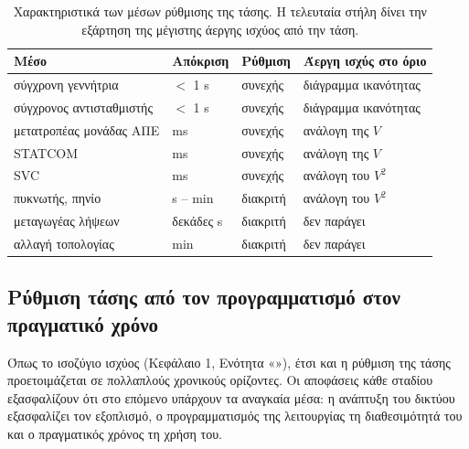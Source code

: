 \begin{table}[!htbp]
\centering
\begin{tabular}{llll}
\hline
Μέσο & Απόκριση & Ρύθμιση & Άεργη ισχύς στο όριο \\
\hline
σύγχρονη γεννήτρια & $<$ 1 s & συνεχής & διάγραμμα ικανότητας \\
σύγχρονος αντισταθμιστής & $<$ 1 s & συνεχής & διάγραμμα ικανότητας \\
μετατροπέας μονάδας ΑΠΕ & ms & συνεχής & ανάλογη της $V$ \\
STATCOM & ms & συνεχής & ανάλογη της $V$ \\
SVC & ms & συνεχής & ανάλογη του $V^2$ \\
πυκνωτής, πηνίο & s -- min & διακριτή & ανάλογη του $V^2$ \\
μεταγωγέας λήψεων & δεκάδες s & διακριτή & δεν παράγει \\
αλλαγή τοπολογίας & min & διακριτή & δεν παράγει \\
\hline
\end{tabular}
\caption{Χαρακτηριστικά των μέσων ρύθμισης της τάσης. Η τελευταία στήλη δίνει την εξάρτηση της
μέγιστης άεργης ισχύος από την τάση.}
\label{tab:v-means}
\end{table}

\subsection{Ρύθμιση τάσης από τον προγραμματισμό στον πραγματικό χρόνο}
\label{sec:v-stages}

Όπως το ισοζύγιο ισχύος (Κεφάλαιο 1, Ενότητα «»), έτσι και η ρύθμιση της
τάσης προετοιμάζεται σε πολλαπλούς χρονικούς ορίζοντες. Οι αποφάσεις κάθε σταδίου εξασφαλίζουν
ότι στο επόμενο υπάρχουν τα αναγκαία μέσα: η ανάπτυξη του δικτύου εξασφαλίζει τον εξοπλισμό, ο
προγραμματισμός της λειτουργίας τη διαθεσιμότητά του και ο πραγματικός χρόνος τη χρήση του.

